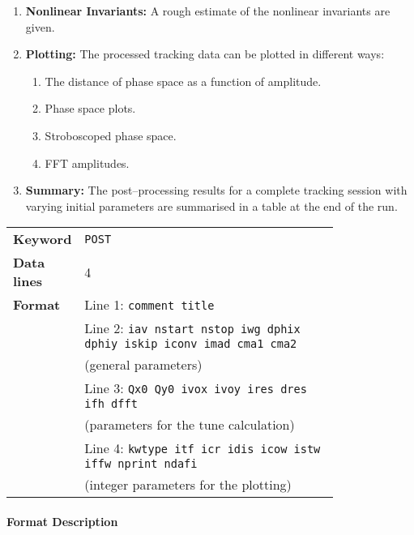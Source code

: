 \begin{enumerate}
    \item \textbf{Nonlinear Invariants:} A rough estimate of the nonlinear invariants are given.
    \item \textbf{Plotting:} The processed tracking data can be plotted in different ways:
    \begin{enumerate}
        \item The distance of phase space as a function of amplitude.
        \item Phase space plots.
        \item Stroboscoped phase space.
        \item FFT amplitudes.
    \end{enumerate}
    \item \textbf{Summary:} The post--processing results for a complete tracking session with varying initial parameters are summarised in a table at the end of the run.
\end{enumerate}

\bigskip
\begin{tabular}{@{}lp{0.8\linewidth}}
    \textbf{Keyword}    & \texttt{POST} \\
    \textbf{Data lines} & 4 \\
    \textbf{Format}     & Line 1: \texttt{comment title} \\
                        & Line 2: \texttt{iav nstart nstop iwg dphix dphiy iskip iconv imad cma1 cma2} \\
                        & (general parameters) \\
                        & Line 3: \texttt{Qx0 Qy0 ivox ivoy ires dres ifh dfft} \\
                        & (parameters for the tune calculation) \\
                        & Line 4: \texttt{kwtype itf icr idis icow istw iffw nprint ndafi} \\
                        & (integer parameters for the plotting)
\end{tabular}

\paragraph{Format Description}~

